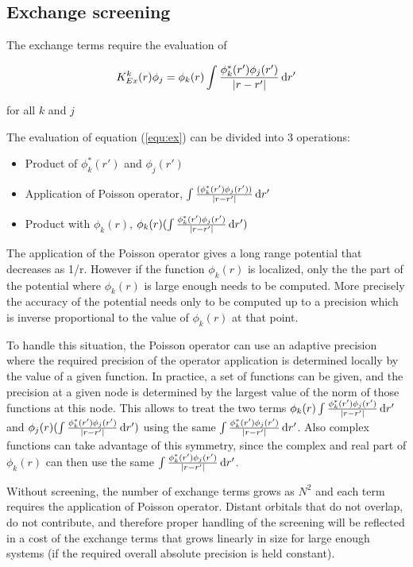 \documentclass{article}
\begin{document}

\subsection{Exchange screening}
\label{Xscreen}

The exchange terms require the evaluation of

\begin{equation}
\label{equ:ex}
  K_{Ex}^k(r) \phi_j = \phi_k(r) \int \frac{\phi^*_k(r')\phi_j(r')}{|r-r'|} \,\mathrm{d} r'
\end{equation}

 for all $k$ and $j$

The evaluation of equation (\ref{equ:ex}) can be divided into 3 operations:
\begin{itemize}
\item Product of $\phi^*_k(r')$ and $\phi_j(r')$
\item Application of Poisson operator, $\int \frac{(\phi^*_k(r')\phi_j(r'))}{|r-r'|} \,\mathrm{d} r'$
\item Product with $\phi_k(r)$, $\phi_k(r) (\int \frac{\phi^*_k(r')\phi_j(r')}{|r-r'|} \,\mathrm{d} r')$
\end{itemize}

The application of the Poisson operator gives a long range potential that decreases as 1/r. However if the function $\phi_k(r)$ is localized, only the the part of the potential where $\phi_k(r)$ is large enough needs to be computed. More precisely the accuracy of the potential needs only to be computed up to a precision which is inverse proportional to the value of $\phi_k(r)$ at that point. 

To handle this situation, the Poisson operator can use an adaptive precision where the required precision of the operator application is determined locally by the value of a given function. In practice, a set of functions can be given, and the precision at a given node is determined by the largest value of the norm of those functions at this node. This allows to treat the two terms $\phi_k(r) \int \frac{\phi^*_k(r')\phi_j(r')}{|r-r'|} \,\mathrm{d} r'$ and  $\phi_j(r) (\int \frac{\phi^*_k(r')\phi_j(r')}{|r-r'|} \,\mathrm{d} r')$ using the same $\int \frac{\phi^*_k(r')\phi_j(r')}{|r-r'|} \,\mathrm{d} r'$.  Also complex functions can take advantage of this symmetry, since the complex and real part of $\phi_k(r)$ can then use the same $\int \frac{\phi^*_k(r')\phi_j(r')}{|r-r'|} \,\mathrm{d} r'$.

Without screening, the number of exchange terms grows as $N^2$ and each term requires the application of Poisson operator. Distant orbitals that do not overlap, do not contribute, and therefore proper handling of the screening will be reflected in a cost of the exchange terms that grows linearly in size for large enough systems (if the required overall absolute precision is held constant).
\end{document}
